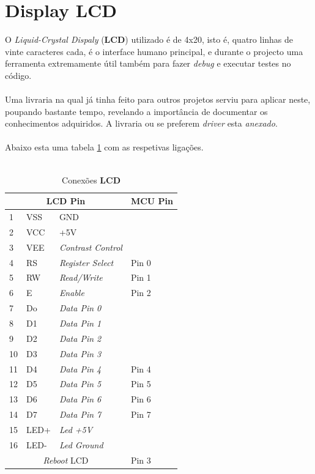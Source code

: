 \section{Display LCD}
O \textit{Liquid-Crystal Dispaly} (\textbf{LCD}) utilizado é de 4x20, isto é, quatro linhas de vinte caracteres cada, é o interface humano principal, e durante o projecto uma ferramenta extremamente útil também para fazer \textit{debug} e executar testes no código.
\\
\\
Uma livraria na qual já tinha feito para outros projetos serviu para aplicar neste, poupando bastante tempo, revelando a importância de documentar os conhecimentos adquiridos. A livraria ou se preferem \textit{driver} esta \textit{anexado}.
\\
\\
Abaixo esta uma tabela \ref{LCD_connections} com as respetivas ligações.
\\
\\
\begin{table}[H]
	\centering
	\caption{Conexões \textbf{LCD}}
	\begin{tabular}{||p{1cm} p{2cm} p{4cm} | p{1cm}||} 
		\hline
		\multicolumn{3}{||c|}{\textbf{LCD Pin}} & \multicolumn{1}{|c||}{\textbf{MCU Pin}}\\ [1ex]
		\hline
		1 & VSS & GND & \\
		2 & VCC & +5V & \\
		3 & VEE & \textit{Contrast Control} & \\
		4 & RS & \textit{Register Select} & Pin 0 \\
		5 & RW & \textit{Read/Write} & Pin 1 \\
		6 & E & \textit{Enable} & Pin 2 \\
		7 & Do & \textit{Data Pin 0} & \\
		8 & D1 & \textit{Data Pin 1} & \\
		9 & D2 & \textit{Data Pin 2} & \\
		10 & D3 & \textit{Data Pin 3} & \\
		11 & D4 & \textit{Data Pin 4} & Pin 4 \\
		12 & D5 & \textit{Data Pin 5} & Pin 5 \\
		13 & D6 & \textit{Data Pin 6} & Pin 6 \\
		14 & D7 & \textit{Data Pin 7} & Pin 7 \\
		15 & LED+ & \textit{Led +5V} &  \\
		16 & LED- & \textit{Led Ground} & \\
		\multicolumn{3}{||c|}{\textit{Reboot} LCD} & \multicolumn{1}{|l||}{Pin 3}\\ [1ex]
		\hline
	\end{tabular}	
	\label{LCD_connections}
\end{table}
\newpage
